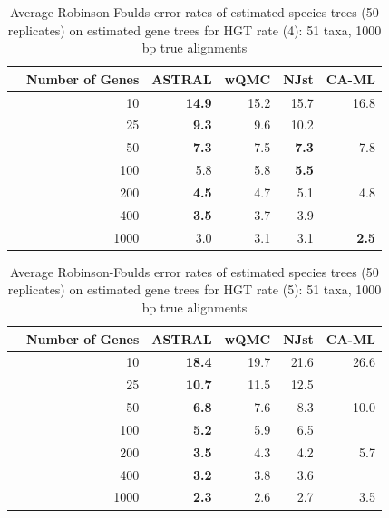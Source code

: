 \begin{table}[h!]
\caption[Error rates of estimated species trees (50 replicates)  on estimated gene trees for HGT rate 4]{Average Robinson-Foulds error rates of estimated species trees (50 replicates)  on estimated gene trees for HGT rate (4): 51 taxa, 1000 bp true alignments}
\begin{tabular}{rrrrrr}
 & Number of Genes & ASTRAL & wQMC   & NJst & CA-ML \\
\hline
 & 10 & \textbf{14.9} & 15.2 &   15.7 & 16.8\\
 & 25 & \textbf{9.3} & 9.6 &  10.2 & \\
 & 50 & \textbf{7.3} & 7.5  & \textbf{7.3} & 7.8\\
 & 100 & 5.8 & 5.8 &   \textbf{5.5} & \\
 & 200 & \textbf{4.5} & 4.7   & 5.1 & 4.8 \\
 & 400 & \textbf{3.5} & 3.7  & 3.9 & \\
 & 1000 & 3.0 & 3.1 &  3.1 & \textbf{2.5} \\
\end{tabular}
\label{hgt::table4}
\end{table}

\begin{table}[h!]
\caption[Error rates of estimated species trees (50 replicates)  on estimated gene trees for HGT rate 5]{Average Robinson-Foulds error rates of estimated species trees (50 replicates)  on estimated gene trees for HGT rate (5): 51 taxa, 1000 bp true alignments}
\begin{tabular}{rrrrrr}
 & Number of Genes & ASTRAL & wQMC   & NJst & CA-ML\\
\hline
 & 10 & \textbf{18.4} & 19.7 &   21.6 & 26.6 \\
 & 25 & \textbf{10.7} & 11.5   & 12.5 & \\
 & 50 & \textbf{6.8} & 7.6 &  8.3 & 10.0\\
 & 100 & \textbf{5.2} & 5.9 &   6.5 & \\
 & 200 & \textbf{3.5} & 4.3 &   4.2 & 5.7 \\
 & 400 & \textbf{3.2} & 3.8 &   3.6 & \\
 & 1000 & \textbf{2.3} & 2.6   & 2.7 & 3.5 \\
\end{tabular}
\label{hgt::table5}
\end{table}

